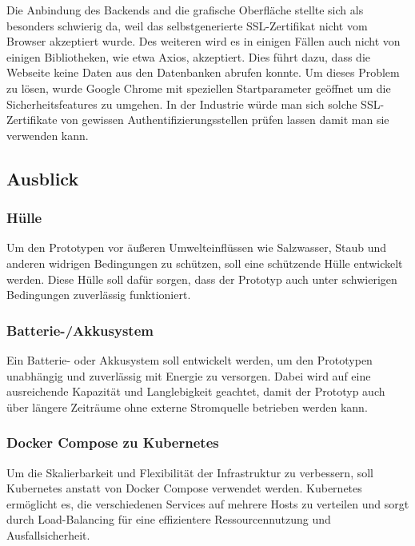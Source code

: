 \documentclass[
    headings=optiontotocandhead,%
    twoside,
    numbers=noenddot,%
    12pt, %
    titlepage, %
    parskip=full, %
    listof=leveldown, 
    numbers=noenddot, %
    a4paper,DIV=14,
    BCOR=15mm,
]{scrbook}
\begin{document}
Die Anbindung des Backends and die grafische Oberfläche stellte sich als
besonders schwierig da, weil das selbstgenerierte SSL-Zertifikat nicht
vom Browser akzeptiert wurde. Des weiteren wird es in einigen Fällen
auch nicht von einigen Bibliotheken, wie etwa Axios, akzeptiert. Dies
führt dazu, dass die Webseite keine Daten aus den Datenbanken abrufen
konnte. Um dieses Problem zu lösen, wurde Google Chrome mit speziellen
Startparameter geöffnet um die Sicherheitsfeatures zu umgehen. In der
Industrie würde man sich solche SSL-Zertifikate von gewissen
Authentifizierungsstellen prüfen lassen damit man sie verwenden kann.

\hypertarget{ausblick}{%
\subsection{Ausblick}\label{ausblick}}

\hypertarget{huxfclle}{%
\subsubsection{Hülle}\label{huxfclle}}

Um den Prototypen vor äußeren Umwelteinflüssen wie Salzwasser, Staub und
anderen widrigen Bedingungen zu schützen, soll eine schützende Hülle
entwickelt werden. Diese Hülle soll dafür sorgen, dass der Prototyp auch
unter schwierigen Bedingungen zuverlässig funktioniert.

\hypertarget{batterie-akkusystem}{%
\subsubsection{Batterie-/Akkusystem}\label{batterie-akkusystem}}

Ein Batterie- oder Akkusystem soll entwickelt werden, um den Prototypen
unabhängig und zuverlässig mit Energie zu versorgen. Dabei wird auf eine
ausreichende Kapazität und Langlebigkeit geachtet, damit der Prototyp
auch über längere Zeiträume ohne externe Stromquelle betrieben werden
kann.

\hypertarget{docker-compose-zu-kubernetes}{%
\subsubsection{Docker Compose zu
Kubernetes}\label{docker-compose-zu-kubernetes}}

Um die Skalierbarkeit und Flexibilität der Infrastruktur zu verbessern,
soll Kubernetes anstatt von Docker Compose verwendet werden. Kubernetes
ermöglicht es, die verschiedenen Services auf mehrere Hosts zu verteilen
und sorgt durch Load-Balancing für eine effizientere Ressourcennutzung
und Ausfallsicherheit.
\end{document}
